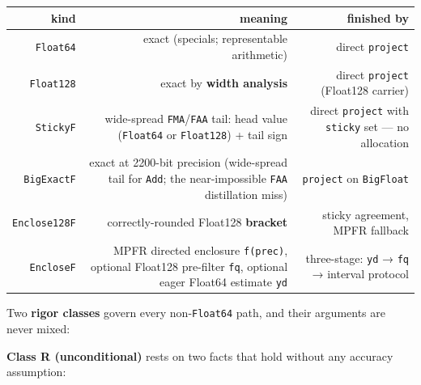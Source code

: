 \begin{table}[h]
\centering
\begin{tabulary}{\linewidth}{R R R}
\toprule
kind & meaning & finished by \\
\toprule
\texttt{Float64} & exact (specials; representable arithmetic) & direct \texttt{project} \\
\texttt{Float128} & exact by \textbf{width analysis} & direct \texttt{project} (Float128 carrier) \\
\texttt{StickyF} & wide-spread \texttt{FMA}/\texttt{FAA} tail: head value (\texttt{Float64} or \texttt{Float128}) + tail sign & direct \texttt{project} with \texttt{sticky} set — no allocation \\
\texttt{BigExactF} & exact at 2200-bit precision (wide-spread tail for \texttt{Add}; the near-impossible \texttt{FAA} distillation miss) & \texttt{project} on \texttt{BigFloat} \\
\texttt{Enclose128F} & correctly-rounded Float128 \textbf{bracket} & sticky agreement, MPFR fallback \\
\texttt{EncloseF} & MPFR directed enclosure \texttt{f(prec)}, optional Float128 pre-filter \texttt{fq}, optional eager Float64 estimate \texttt{yd} & three-stage: \texttt{yd} → \texttt{fq} → interval protocol \\
\bottomrule
\end{tabulary}

\end{table}



Two \textbf{rigor classes} govern every non-\texttt{Float64} path, and their arguments are never mixed:



\textbf{Class R (unconditional)} rests on two facts that hold without any accuracy assumption:



